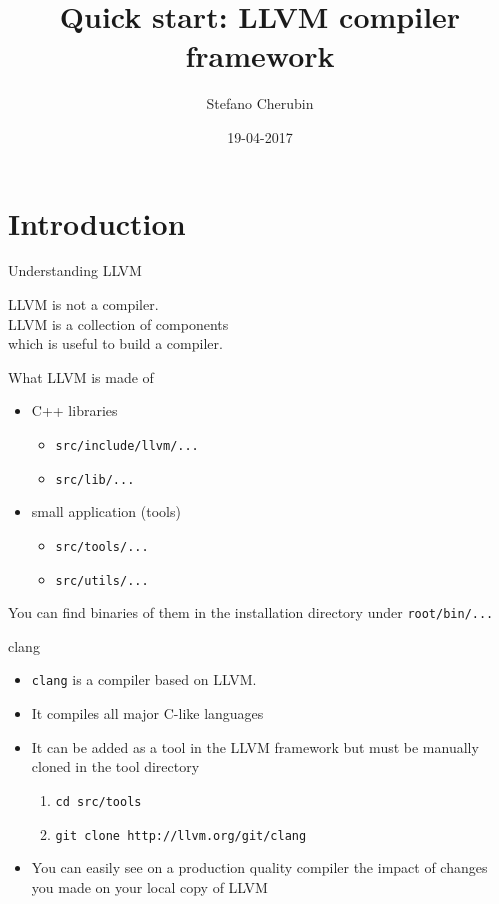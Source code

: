 \documentclass[10pt,mathserif]{beamer}
\author{Stefano Cherubin}
\institute{Politecnico di Milano}
\date{19-04-2017}
\title{Quick start: LLVM compiler framework}
\begin{document}
\begin{frame}
\maketitle
\end{frame}

\section{Introduction}
\begin{frame}{Understanding LLVM}
	\begin{center}
	\huge{
		LLVM is not a compiler.\\
		\pause
		\vfill
		LLVM is a collection of components\\
		which is useful to build a compiler.
	}
	\end{center}
\end{frame}

\begin{frame}{What LLVM is made of}
\begin{itemize}
	\item C++ libraries
		\begin{itemize}
			\item \texttt{src/include/llvm/...}
			\item \texttt{src/lib/...}
		\end{itemize}
		\vfill
	\item small application (tools)
		\begin{itemize}
			\item \texttt{src/tools/...}
			\item \texttt{src/utils/...}
		\end{itemize}
\end{itemize}
\vfill
You can find binaries of them in the installation directory under \texttt{root/bin/...}
\end{frame}

\begin{frame}{clang}
\begin{itemize}
	\item \texttt{clang} is a compiler based on LLVM.
	\vfill
	\item It compiles all major C-like languages
	\vfill
	\item It can be added as a tool in the LLVM framework but must be manually cloned in the tool directory
	\begin{enumerate}
		\item \texttt{cd src/tools}
		\item \texttt{git clone http://llvm.org/git/clang}
	\end{enumerate}
	\vfill
	\item You can easily see on a production quality compiler the impact of changes you made on your local copy of LLVM
\end{itemize}
\end{frame}
\end{document}
